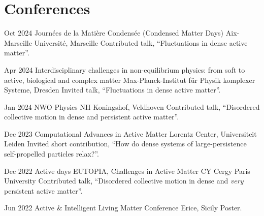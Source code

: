 \documentclass[a4paper]{cvtemplate_en} %
\begin{document}
\section{Conferences}

\begin{cvbody}

\cvitem
	{Oct 2024}
	{}
	{Journ\'ees de la Mati\`ere Condens\'ee (Condensed Matter Days)}
	{Aix-Marseille Universit\'e, Marseille \vspace{-5pt}}
	{}{}{}
	{}
	{Contributed talk, ``Fluctuations in dense active matter''.\\}

\cvitem
	{Apr 2024}
	{}
	{Interdisciplinary challenges in non-equilibrium physics: from soft to active, biological and complex matter}
	{Max-Planck-Institut für Physik komplexer Systeme, Dresden }
	{}{}{}
	{}
	{Invited talk, ``Fluctuations in dense active matter''.\\}

\cvitem
	{Jan 2024}
	{}
	{NWO Physics}
	{NH Koningshof, Veldhoven }
	{}{}{}
	{}
	{Contributed talk, ``Disordered collective motion in dense and persistent active matter''.\\}

\cvitem
	{Dec 2023}
	{}
	{Computational Advances in Active Matter}
	{Lorentz Center, Universiteit Leiden }
	{}{}{}
	{}
	{Invited short contribution, ``How do dense systems of large-persistence self-propelled particles relax?''.\\}

\cvitem
	{Dec 2022}
	{}
	{Active days EUTOPIA, Challenges in Active Matter}
	{CY Cergy Paris University }
	{}{}{}
	{}
	{Contributed talk, ``Disordered collective motion in dense and \textit{very}\\ persistent active matter''.\\}


\cvitem
	{Jun 2022}
	{}
	{Active \& Intelligent Living Matter Conference}
	{Erice, Sicily }
	{}{}{}
	{}
	{Poster.\\}



\end{cvbody}
\end{document}
